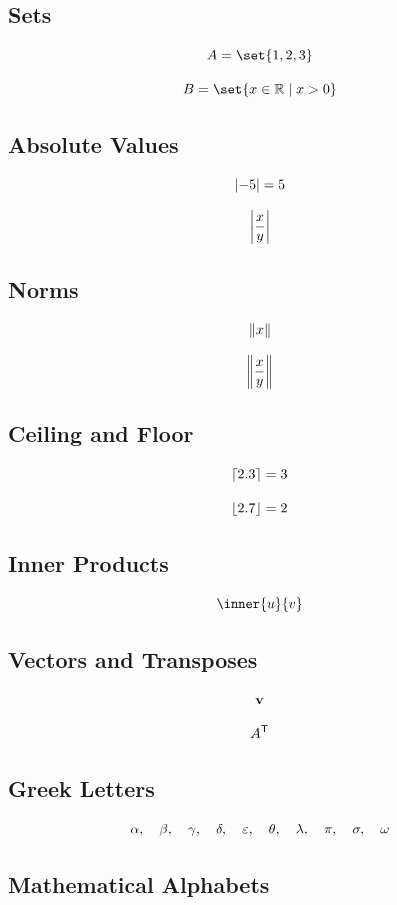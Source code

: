 \documentclass{article}
\begin{document}
\subsection{Sets}

\[
    A=\set{1,2,3}
\]

\[
    B=\set{x\in\R\mid x>0}
\]

\subsection{Absolute Values}

\[
    \abs{-5}=5
\]

\[
    \abs*{\frac{x}{y}}
\]

\subsection{Norms}

\[
    \norm{x}
\]

\[
    \norm*{\frac{x}{y}}
\]

\subsection{Ceiling and Floor}

\[
    \ceil{2.3}=3
\]

\[
    \floor{2.7}=2
\]

\subsection{Inner Products}

\[
    \inner{u}{v}
\]

\subsection{Vectors and Transposes}

\[
    \vect{v}
\]

\[
    A\transpose
\]

\subsection{Greek Letters}

\[
    \alpha,\quad
    \beta,\quad
    \gamma,\quad
    \delta,\quad
    \eps,\quad
    \theta,\quad
    \lambda,\quad
    \pi,\quad
    \sigma,\quad
    \omega
\]

\subsection{Mathematical Alphabets}
\end{document}

